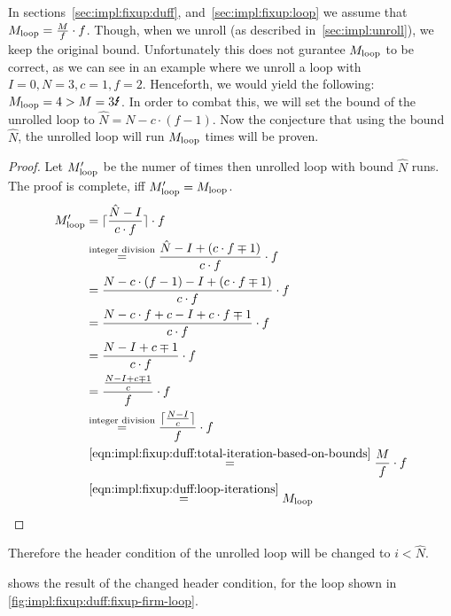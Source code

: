 In sections~\ref{sec:impl:fixup:duff}, and~\ref{sec:impl:fixup:loop} we assume that $M_{\text{loop}} = \frac{M}{f} \cdot f$.
Though, when we unroll (as described in~\cref{sec:impl:unroll}), we keep the original bound.
Unfortunately this does not gurantee $M_{\text{loop}}$ to be correct, as we can see in an example where we unroll a loop with $I = 0, N = 3, c = 1, f = 2$.
Henceforth, we would yield the following: $\Mloop = 4 > M = 3 \mLightning$.
In order to combat this, we will set the bound of the unrolled loop to $\hat{N} = N - c \cdot (f - 1)$.
Now the conjecture that using the bound $\hat{N}$, the unrolled loop will run $M_{\text{loop}}$ times will be proven.
\begin{proof}
    Let $M_{\text{loop}}'$ be the numer of times then unrolled loop with bound $\hat{N}$ runs.
    The proof is complete, iff $M_{\text{loop}}' = M_{\text{loop}}$.
    \begin{align*}
        M_{\text{loop}}' &= \lceil{}\frac{\hat{N} - I}{c \cdot f}\rceil{} \cdot f\\
        &\overset{\text{integer division}}{=} \frac{\hat{N} - I + (c \cdot f \mp 1)}{c \cdot f} \cdot f\\
        &= \frac{N - c \cdot (f - 1) - I + (c \cdot f \mp 1)}{c \cdot f} \cdot f\\
        &= \frac{N - c \cdot f + c - I + c \cdot f \mp 1}{c \cdot f} \cdot f\\
        &= \frac{N - I + c \mp 1}{c \cdot f} \cdot f\\
        &= \frac{\frac{N - I + c \mp 1}{c}}{f} \cdot f\\
        &\overset{\text{integer division}}{=} \frac{\lceil{}\frac{N - I}{c}\rceil{}}{f} \cdot f\\
        &\overset{\ref{eqn:impl:fixup:duff:total-iteration-based-on-bounds}}{=} \frac{M}{f} \cdot f\\
        &\overset{\ref{eqn:impl:fixup:duff:loop-iterations}}{=} M_{\text{loop}}
    \end{align*}
\end{proof}

Therefore the header condition of the unrolled loop will be changed to $i < \hat{N}$.

 shows the result of the changed header condition, for the loop shown in \cref{fig:impl:fixup:duff:fixup-firm-loop}.

